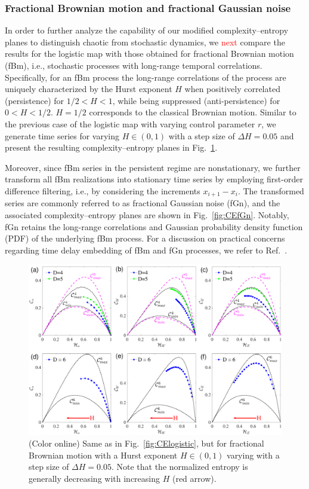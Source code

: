 \documentclass[aip,cha,reprint,nofootinbib]{revtex4-1}
\begin{document}
\subsubsection{Fractional Brownian motion and fractional Gaussian noise}
In order to further analyze the capability of our modified complexity--entropy planes to distinguish chaotic from stochastic dynamics, we \textcolor{red}{next} compare the results for the logistic map with those obtained for fractional Brownian motion (fBm), i.e., stochastic processes with long-range temporal correlations. Specifically, for an fBm process the long-range correlations of the process are uniquely characterized by the Hurst exponent $H$ when positively correlated (persistence) for $1/2 < H < 1$, while being suppressed (anti-persistence) for $0< H < 1/2$. $H=1/2$ corresponds to the classical Brownian motion. Similar to the previous case of the logistic map with varying control parameter $r$, we generate time series for varying $H \in (0, 1)$ with a step size of $\Delta H=0.05$ and present the resulting complexity--entropy planes in Fig.~\ref{fig:CEfBm}. 

Moreover, since fBm series in the persistent regime are nonstationary, we further transform all fBm realizations into stationary time series by employing first-order difference filtering, i.e., by considering the increments $x_{i+1}- x_i$. The transformed series are commonly referred to as fractional Gaussian noise (fGn), and the associated complexity--entropy planes are shown in Fig.~\ref{fig:CEfGn}. Notably, fGn retains the long-range correlations and Gaussian probability density function (PDF) of the underlying fBm process. For a discussion on practical concerns regarding time delay embedding of fBm and fGn processes, we refer to Ref.~\cite{Zou2015}. 

\begin{figure}
	\centering 
	\includegraphics[width=2\columnwidth]{CompEntropy_fBm.pdf}
\caption{\small{(Color online) Same as in Fig.~\ref{fig:CElogistic}, but for fractional Brownian motion with a Hurst exponent $H \in (0, 1)$ varying with a step size of $\Delta H=0.05$. Note that the normalized entropy is generally decreasing with increasing $H$ (red arrow).}  \label{fig:CEfBm}}
\end{figure}
\end{document}
